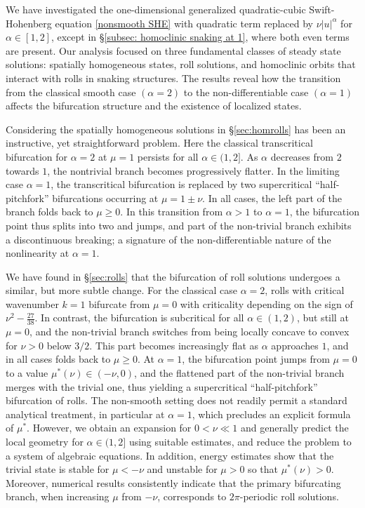 \documentclass{article}
\numberwithin{equation}{section}
\begin{document}
	
	
	
	We have investigated the one-dimensional generalized quadratic-cubic Swift-Hohenberg equation \eqref{nonsmooth SHE} with quadratic term replaced by $\nu |u|^\alpha$  for $\alpha \in [1,2]$, except in \S\ref{subsec: homoclinic snaking at 1}, where both even terms are present. Our analysis focused on three fundamental classes of steady state solutions: spatially homogeneous states, roll solutions, and homoclinic orbits that interact with rolls in snaking structures. The results reveal how the transition from the classical smooth case $(\alpha=2)$ to the non-differentiable case $(\alpha=1)$ affects the bifurcation structure and the existence of localized states.
	
	Considering the spatially homogeneous solutions in \S\ref{sec:homrolls} has been an instructive, yet straightforward problem. Here the classical transcritical bifurcation for $\alpha=2$ at $\mu=1$ persists for all $\alpha \in (1,2]$. As $\alpha$ decreases from $2$ towards $1$, the nontrivial branch becomes progressively flatter. In the limiting case $\alpha=1$, the transcritical bifurcation is replaced by two supercritical ``half-pitchfork'' bifurcations occurring at $\mu = 1 \pm \nu$. In all cases, the left part of the branch folds back to $\mu\geq 0$. In this transition from $\alpha>1$ to $\alpha=1$, the bifurcation point thus splits into two and jumps, and part of the non-trivial branch exhibits a discontinuous breaking; a signature of the non-differentiable nature of the nonlinearity at $\alpha=1$.
	
	We have found in \S\ref{sec:rolls} that the bifurcation of roll solutions undergoes a similar, but more subtle change. For the classical case $\alpha=2$, rolls with critical wavenumber $k=1$ bifurcate from $\mu=0$ with criticality depending on the sign of $\nu^2-\frac{27}{38}$. In contrast, the bifurcation is subcritical for all $\alpha \in (1,2)$, but still at $\mu=0$, and the non-trivial branch switches from being locally concave to convex for $\nu>0$ below $3/2$. This part becomes increasingly flat as $\alpha$ approaches $1$, and in all cases folds back to $\mu\geq 0$. 
	At $\alpha=1$, the bifurcation point jumps from $\mu=0$ to a value  $\mu^*(\nu)\in(-\nu,0)$, and the flattened part of the non-trivial branch merges with the trivial one, thus yielding a supercritical ``half-pitchfork'' bifurcation of rolls.  The non-smooth setting does not readily permit a standard analytical treatment, in particular at $\alpha=1$, which precludes an explicit formula of $\mu^*$. However, we obtain an expansion for $0<\nu \ll1$ and generally predict the local geometry for $\alpha\in(1,2]$ using suitable estimates, and reduce the problem to a system of algebraic equations. In addition, energy estimates show that the trivial state is stable for $\mu<-\nu$ and unstable for $\mu>0$ so that $\mu^*(\nu)>0$. Moreover, numerical results consistently indicate that the primary bifurcating branch, when increasing $\mu$ from $-\nu$, corresponds to $2\pi$-periodic roll solutions.
	
\end{document}
